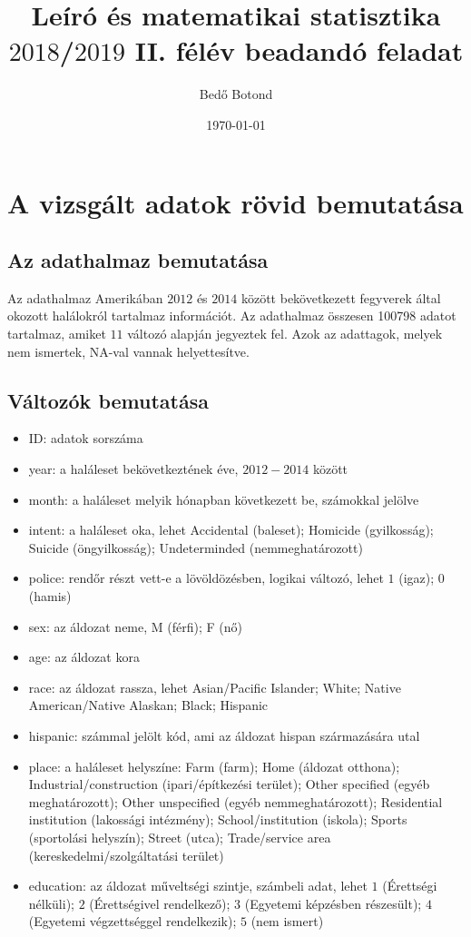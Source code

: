 \documentclass{article}
\title{Leíró és matematikai statisztika $2018$/$2019$ II. félév beadandó feladat}
\author{Bedő Botond}
\date{\today}
\begin{document}
\maketitle
\newpage	

\section{A vizsgált adatok rövid bemutatása}
\subsection{Az adathalmaz bemutatása}
Az adathalmaz Amerikában $2012$ és $2014$ között bekövetkezett fegyverek által okozott halálokról tartalmaz információt. Az adathalmaz összesen 100798 adatot tartalmaz, amiket $11$ változó alapján jegyeztek fel. Azok az adattagok, melyek nem ismertek, NA-val vannak helyettesítve.

\subsection{Változók bemutatása}

\begin{itemize}
	\item ID: adatok sorszáma
	\item year: a haláleset bekövetkeztének éve, $2012-2014$ között
	\item month: a haláleset melyik hónapban következett be, számokkal jelölve
	\item intent: a haláleset oka, lehet Accidental (baleset); Homicide (gyilkosság); Suicide (öngyilkosság); Undeterminded (nemmeghatározott)
	\item police: rendőr részt vett-e a lövöldözésben, logikai változó, lehet $1$ (igaz); $0$ (hamis) 
	\item sex: az áldozat neme, M (férfi); F (nő)
	\item age: az áldozat kora
	\item race: az áldozat rassza, lehet Asian/Pacific Islander; White; Native American/Native Alaskan; Black; Hispanic
	\item hispanic: számmal jelölt kód, ami az áldozat hispan származására utal
	\item place: a haláleset helyszíne: Farm (farm); Home (áldozat otthona); Industrial/construction (ipari/építkezési terület); Other specified (egyéb meghatározott); Other unspecified (egyéb nemmeghatározott); Residential institution (lakossági intézmény); School/institution (iskola); Sports (sportolási helyszín); Street (utca); Trade/service area (kereskedelmi/szolgáltatási terület)
	\item education: az áldozat műveltségi szintje, számbeli adat, lehet $1$ (Érettségi nélküli); $2$ (Érettségivel rendelkező); $3$ (Egyetemi képzésben részesült); $4$ (Egyetemi végzettséggel rendelkezik); $5$ (nem ismert)
\end{itemize}
\end{document}
